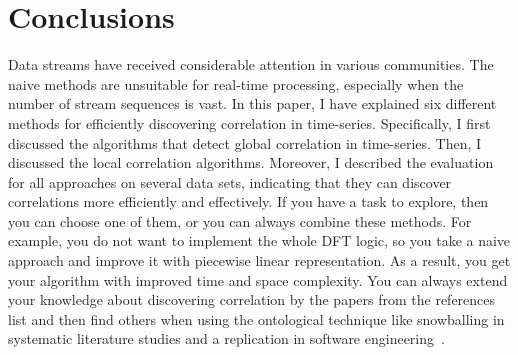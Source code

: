 \section{Conclusions}
\label{sec:4}
Data streams have received considerable attention in various communities. The naive methods are unsuitable for real-time processing, especially when the number of stream sequences is vast. In this paper, I have explained six different methods for efficiently discovering correlation in time-series. Specifically, I first discussed the algorithms that detect global correlation in time-series. Then, I discussed the local correlation algorithms. Moreover, I described the evaluation for all approaches on several data sets, indicating that they can discover correlations more efficiently and effectively. If you have a task to explore, then you can choose one of them, or you can always combine these methods. For example, you do not want to implement the whole DFT logic, so you take a naive approach and improve it with piecewise linear representation. As a result, you get your algorithm with improved time and space complexity. You can always extend your knowledge about discovering correlation by the papers from the references list and then find others when using the ontological technique like snowballing in systematic literature studies and a replication in software engineering~\cite{ref9}.